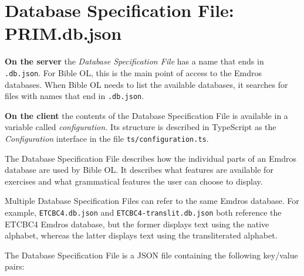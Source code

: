 \documentclass[11pt,oneside,a4paper]{memoir}
\begin{document}
\section{Database Specification File: PRIM.db.json}\label{sec-dsf}

\textbf{On the server} the \emph{Database Specification File} has a name that ends in \texttt{.db.json}. For Bible OL,
this is the main point of access to the Emdros databases. When Bible OL needs to list the available
databases, it searches for files with names that end in \texttt{.db.json}.

\textbf{On the client} the contents of the Database Specification File is available in a variable
called \emph{configuration.}%
Its structure is described in TypeScript as the \emph{Configuration}%
interface in the file \texttt{ts/configuration.ts}.

The Database Specification File describes how the individual parts of an Emdros database are used by Bible
OL. It describes what features are available for exercises and what grammatical features the user
can choose to display.

Multiple Database Specification Files can refer to the same Emdros database. For example,
\texttt{ETCBC4.db.json} and \texttt{ETCBC4-translit.db.json} both reference the ETCBC4 Emdros
database, but the former displays text using the native alphabet, whereas the
latter displays text using the transliterated alphabet.

The Database Specification File is a JSON file containing the following key/value pairs:
\end{document}
